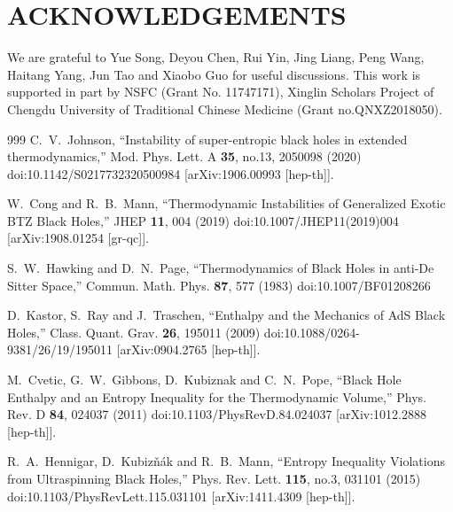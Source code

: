 \documentclass[aps,preprint]{revtex4}%
\begin{document}
\section{ACKNOWLEDGEMENTS}
We are grateful to Yue Song, Deyou Chen, Rui Yin, Jing Liang, Peng Wang, Haitang Yang, Jun Tao and Xiaobo Guo for useful discussions. This work is supported in part by NSFC (Grant No. 11747171), Xinglin Scholars Project of Chengdu University of Traditional Chinese Medicine (Grant no.QNXZ2018050).


\begin{thebibliography}{999}
C.~V.~Johnson,
``Instability of super-entropic black holes in extended thermodynamics,''
Mod. Phys. Lett. A \textbf{35}, no.13, 2050098 (2020)
doi:10.1142/S0217732320500984
[arXiv:1906.00993 [hep-th]].

W.~Cong and R.~B.~Mann,
``Thermodynamic Instabilities of Generalized Exotic BTZ Black Holes,''
JHEP \textbf{11}, 004 (2019)
doi:10.1007/JHEP11(2019)004
[arXiv:1908.01254 [gr-qc]].




S.~W.~Hawking and D.~N.~Page,
``Thermodynamics of Black Holes in anti-De Sitter Space,''
Commun. Math. Phys. \textbf{87}, 577 (1983)
doi:10.1007/BF01208266

D.~Kastor, S.~Ray and J.~Traschen,
``Enthalpy and the Mechanics of AdS Black Holes,''
Class. Quant. Grav. \textbf{26}, 195011 (2009)
doi:10.1088/0264-9381/26/19/195011
[arXiv:0904.2765 [hep-th]].





M.~Cvetic, G.~W.~Gibbons, D.~Kubiznak and C.~N.~Pope,
``Black Hole Enthalpy and an Entropy Inequality for the Thermodynamic Volume,''
Phys. Rev. D \textbf{84}, 024037 (2011)
doi:10.1103/PhysRevD.84.024037
[arXiv:1012.2888 [hep-th]].


R.~A.~Hennigar, D.~Kubiz\v{n}\'ak and R.~B.~Mann,
``Entropy Inequality Violations from Ultraspinning Black Holes,''
Phys. Rev. Lett. \textbf{115}, no.3, 031101 (2015)
doi:10.1103/PhysRevLett.115.031101
[arXiv:1411.4309 [hep-th]].





\end{thebibliography}
\end{document}

